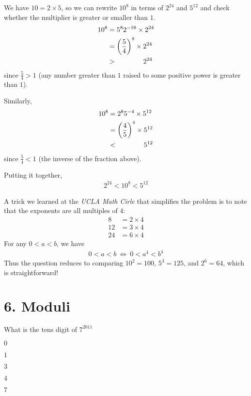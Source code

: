 \documentclass[12pt]{article}
\begin{document}
We have $10 = 2 \times 5$, so we can rewrite $10^{8}$ in terms of $2^{24}$ and $5^{12}$ and check whether the multiplier is greater or smaller than $1$.
\begin{align*}
10^{8} & = 5^{8}2^{-16} \times 2^{24} \\
       & = \left(\frac{5}{4}\right)^{8} \times 2^{24} \\
       & > \hspace{3.9em} 2^{24}
\end{align*}
since $\frac{5}{4}>1$ (any number greater than $1$ raised to some positive power is greater than $1$). 

Similarly,
\begin{align*}
10^{8} & = 2^{8}5^{-4} \times 5^{12} \\
       & = \left(\frac{4}{5}\right)^{4} \times 5^{12} \\
       & < \hspace{3.9em} 5^{12}
\end{align*}
since $\frac{5}{4}<1$ (the inverse of the fraction above). 


Putting it together,
\begin{align*}
2^{24} < 10^{8} < 5^{12}
\end{align*}


A trick we learned at the \textit{UCLA Math Cirle} that simplifies the problem is to note that the exponents are all multiples of $4$:
\begin{align*}
 8 & = 2 \times 4 \\
12 & = 3 \times 4 \\
24 & = 6 \times 4
\end{align*}
For any $0<a<b$, we have
\begin{align*}
0 < a < b
~\Longleftrightarrow~
0 < a^4 < b^4
\end{align*}
Thus the question reduces to comparing $10^{2}=100$, $5^{3}=125$, and $2^{6}=64$, which is straightforward!



\newpage
\section*{6. Moduli}
\begin{question}
What is the tens digit of $7^{2011}$ 
\begin{enumerate*}
  \item $0$
  \item $1$
  \item $3$
  \item $4$
  \item $7$
\end{enumerate*}
\end{question}
\end{document}
